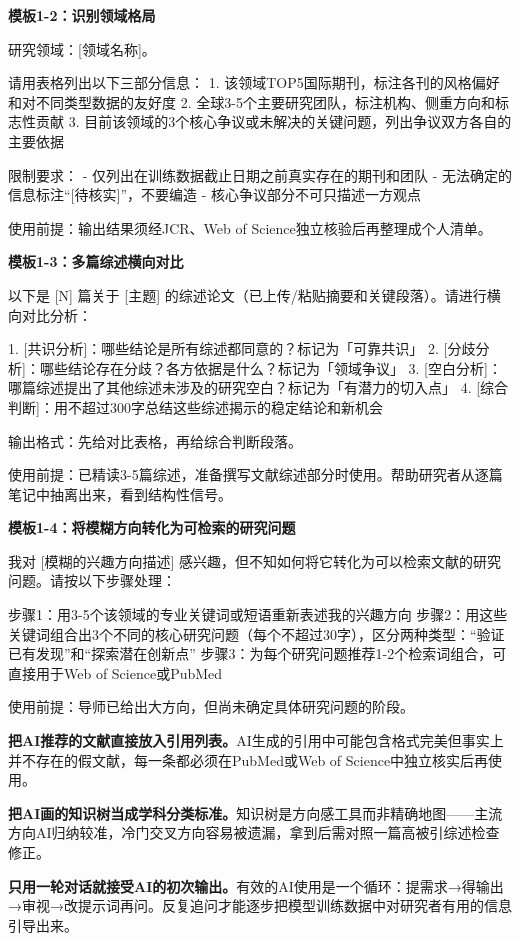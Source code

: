 \textbf{模板1-2：识别领域格局}

\begin{tcolorbox}[promptbox]
研究领域：[领域名称]。

请用表格列出以下三部分信息：
1. 该领域TOP5国际期刊，标注各刊的风格偏好和对不同类型数据的友好度
2. 全球3-5个主要研究团队，标注机构、侧重方向和标志性贡献
3. 目前该领域的3个核心争议或未解决的关键问题，列出争议双方各自的主要依据

限制要求：
- 仅列出在训练数据截止日期之前真实存在的期刊和团队
- 无法确定的信息标注``[待核实]''，不要编造
- 核心争议部分不可只描述一方观点
\end{tcolorbox}

使用前提：输出结果须经JCR、Web of Science独立核验后再整理成个人清单。

\textbf{模板1-3：多篇综述横向对比}

\begin{tcolorbox}[promptbox]
以下是 [N] 篇关于 [主题] 的综述论文（已上传/粘贴摘要和关键段落）。请进行横向对比分析：

1. [共识分析]：哪些结论是所有综述都同意的？标记为「可靠共识」
2. [分歧分析]：哪些结论存在分歧？各方依据是什么？标记为「领域争议」
3. [空白分析]：哪篇综述提出了其他综述未涉及的研究空白？标记为「有潜力的切入点」
4. [综合判断]：用不超过300字总结这些综述揭示的稳定结论和新机会

输出格式：先给对比表格，再给综合判断段落。
\end{tcolorbox}

使用前提：已精读3-5篇综述，准备撰写文献综述部分时使用。帮助研究者从逐篇笔记中抽离出来，看到结构性信号。

\textbf{模板1-4：将模糊方向转化为可检索的研究问题}

\begin{tcolorbox}[promptbox]
我对 [模糊的兴趣方向描述] 感兴趣，但不知如何将它转化为可以检索文献的研究问题。请按以下步骤处理：

步骤1：用3-5个该领域的专业关键词或短语重新表述我的兴趣方向
步骤2：用这些关键词组合出3个不同的核心研究问题（每个不超过30字），区分两种类型：``验证已有发现''和``探索潜在创新点''
步骤3：为每个研究问题推荐1-2个检索词组合，可直接用于Web of Science或PubMed
\end{tcolorbox}

使用前提：导师已给出大方向，但尚未确定具体研究问题的阶段。



\begin{mistakebox}

\textbf{把AI推荐的文献直接放入引用列表。}AI生成的引用中可能包含格式完美但事实上并不存在的假文献，每一条都必须在PubMed或Web of Science中独立核实后再使用。

\smallskip

\textbf{把AI画的知识树当成学科分类标准。}知识树是方向感工具而非精确地图——主流方向AI归纳较准，冷门交叉方向容易被遗漏，拿到后需对照一篇高被引综述检查修正。

\smallskip

\textbf{只用一轮对话就接受AI的初次输出。}有效的AI使用是一个循环：提需求→得输出→审视→改提示词再问。反复追问才能逐步把模型训练数据中对研究者有用的信息引导出来。

\end{mistakebox}

